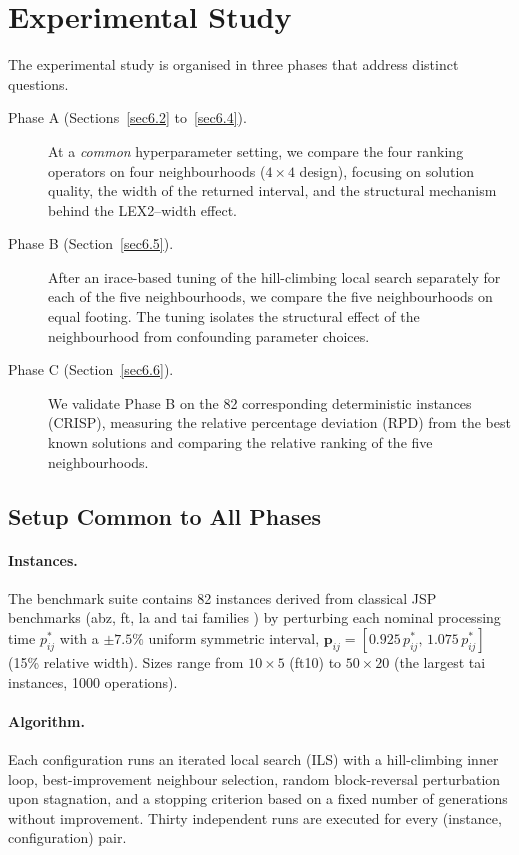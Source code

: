 \documentclass[preprint,12pt]{elsarticle}
\begin{document}
\section{Experimental Study}
\label{sec6}

The experimental study is organised in three phases that address distinct questions.
\begin{description}
\item[Phase A (Sections~\ref{sec6.2} to~\ref{sec6.4}).] At a \emph{common} hyperparameter setting, we compare the four ranking operators on four neighbourhoods ($4 \times 4$ design), focusing on solution quality, the width of the returned interval, and the structural mechanism behind the LEX2--width effect.
\item[Phase B (Section~\ref{sec6.5}).] After an irace-based tuning of the hill-climbing local search separately for each of the five neighbourhoods, we compare the five neighbourhoods on equal footing. The tuning isolates the structural effect of the neighbourhood from confounding parameter choices.
\item[Phase C (Section~\ref{sec6.6}).] We validate Phase B on the 82 corresponding deterministic instances (CRISP), measuring the relative percentage deviation (RPD) from the best known solutions and comparing the relative ranking of the five neighbourhoods.
\end{description}

\subsection{Setup Common to All Phases}
\label{sec6.1}

\paragraph{Instances.} The benchmark suite contains 82 instances derived from classical JSP benchmarks (abz, ft, la and tai families \cite{Taillard1993,Beasley1990}) by perturbing each nominal processing time $p_{ij}^{*}$ with a $\pm 7.5\%$ uniform symmetric interval, $\mathbf{p}_{ij} = [0.925\,p_{ij}^{*},\, 1.075\,p_{ij}^{*}]$ (15\% relative width). Sizes range from $10 \times 5$ (ft10) to $50 \times 20$ (the largest tai instances, 1000 operations).

\paragraph{Algorithm.} Each configuration runs an iterated local search (ILS) with a hill-climbing inner loop, best-improvement neighbour selection, random block-reversal perturbation upon stagnation, and a stopping criterion based on a fixed number of generations without improvement. Thirty independent runs are executed for every (instance, configuration) pair.
\end{document}
